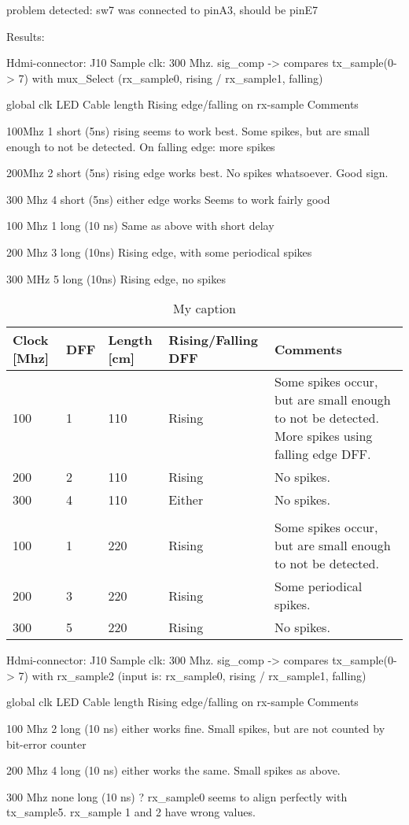\documentclass[main.tex]{subfiles}
\begin{document}
problem detected: sw7 was connected to pinA3, should be pinE7


Results:

Hdmi-connector: J10
Sample clk: 300 Mhz. 
sig_comp -> compares tx_sample(0-> 7) with mux_Select (rx_sample0, rising / rx_sample1, falling)

global clk 	LED 	Cable length 	Rising edge/falling on rx-sample 	Comments

100Mhz		1 	short (5ns) 	rising seems to work best. 				Some spikes, but are small enough to not be detected. On falling edge: more spikes

200Mhz 		2 	short (5ns) 	rising edge works best.					No spikes whatsoever. Good sign.

300 Mhz 	4 	short (5ns) 	either edge works 						Seems to work fairly good


100 Mhz 	1 	long (10 ns) 	Same as above with short delay

200 Mhz 	3	long (10ns) 	Rising edge, with some periodical spikes

300 MHz 	5 	long (10ns)		Rising edge, no spikes 		

\begin{table}[]
\centering
\caption{My caption}
\label{my-label}
\begin{tabular}{|l|l|l|l|l|}
\hline
 Clock [Mhz] 	& DFF  	& Length [cm] 	& Rising/Falling DFF 	& Comments \\ \hline
 100 			& 1 	& 110 			& Rising 				& Some spikes occur, but are small enough to not be detected. More spikes using falling edge DFF.  \\ \hline
 200 			& 2 	& 110 			& Rising 				& No spikes. \\ \hline
 300 			& 4 	& 110 			& Either 				& No spikes. \\ \hline
 \multicolumn{5}{|l|}{} \\ \hline
 100 			& 1 	& 220 			& Rising 				& Some spikes occur, but are small enough to not be detected.\\ \hline
 200 			& 3 	& 220 			& Rising 				& Some periodical spikes.\\ \hline
 300 			& 5 	& 220 			& Rising 				& No spikes.\\ \hline
\end{tabular}
\end{table}



Hdmi-connector: J10
Sample clk: 300 Mhz. 
sig_comp -> compares tx_sample(0-> 7) with rx_sample2 (input is: rx_sample0, rising / rx_sample1, falling)

global clk 	LED 	Cable length 	Rising edge/falling on rx-sample 	Comments

100 Mhz 	2 	long (10 ns) 	either works fine.			Small spikes, but are not counted by bit-error counter

200 Mhz		4 	long (10 ns)	either works the same.			Small spikes as above.

300 Mhz		none 	long (10 ns)	? 					rx_sample0 seems to align perfectly with tx_sample5. rx_sample 1 and 2 have wrong values.
\end{document}

